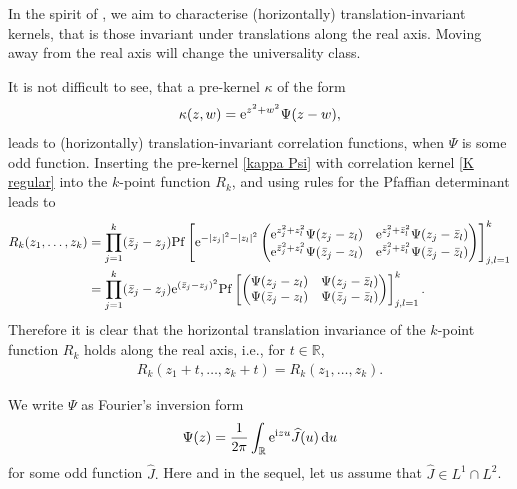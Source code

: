 \documentclass[pdftex]{sigma}
\numberwithin{equation}{section}
\newcommand{\R}{{\mathbb R}}
\newcommand{\1}{\chi}
\newcommand{\Pf}{{\operatorname{Pf}}}
\def\wh{\widehat}
\begin{document}
In the spirit of \cite{MR4030288}, we aim to characterise (horizontally) translation-invariant kernels, that is
those invariant under translations along the real axis. Moving away from the real axis will change the universality class.

It is not difficult to see, that a pre-kernel $\kappa$ of the form
\begin{gather}\label{kappa Psi}
	\kappa(z,w)={\rm e}^{z^2+w^2} \Psi(z-w),
\end{gather}
leads to (horizontally) translation-invariant correlation functions,
when $\Psi$ is some odd function.
Inserting the pre-kernel \eqref{kappa Psi} with correlation kernel \eqref{K regular} into
the $k$-point function $R_k$, and using rules for the Pfaffian determinant leads to
\begin{align*}
R_k(z_1,\dots, z_k) & = \prod_{j=1}^k (\bar{z}_j-z_j) \Pf\left[ {\rm e}^{-|z_j|^2-|z_l|^2} 	\begin{pmatrix}
			{\rm e}^{z_j^2+z_l^2} \Psi(z_j-z_l) & {\rm e}^{z_j^2+\bar{z}_l^2} \Psi(z_j-\bar{z}_l)
			\\
			{\rm e}^{\bar{z}_j^2+z_l^2}\Psi(\bar{z}_j-z_l) & {\rm e}^{\bar{z}_j^2+\bar{z}_l^2 } \Psi(\bar{z}_j-\bar{z}_l)
		\end{pmatrix} \right]_{j,l=1}^k
		\\
		 & = \prod_{j=1}^k (\bar{z}_j-z_j){\rm e}^{(\bar{z}_j-z_j)^2} \Pf\left[ 	\begin{pmatrix}
			\Psi(z_j-z_l) & \Psi(z_j-\bar{z}_l)
			\\
			\Psi(\bar{z}_j-z_l) & \Psi(\bar{z}_j-\bar{z}_l)
		\end{pmatrix} \right]_{j,l=1}^k.
\end{align*}
Therefore it is clear that the horizontal translation invariance of the $k$-point function
$R_k$ holds along the real axis, i.e., for $t \in \R$,
\begin{gather*}
R_k(z_1+t,\dots,z_k+t)=R_k(z_1,\dots,z_k).
\end{gather*}

We write $\Psi$ as Fourier's inversion form
\begin{gather} \label{Psi J hat}
	\Psi(z)=\frac{1}{2\pi} \int_{\R} {\rm e}^{{\rm i}zu} \wh{J}(u)\,{\rm d}u
\end{gather}
for some odd function $\wh{J}.$ Here and in the sequel, let us assume that $\wh{J} \in L^1 \cap L^2$.
\end{document}
